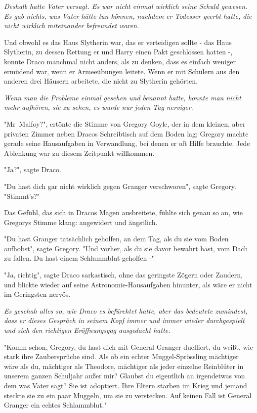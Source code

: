 {\emph{Deshalb hatte Vater versagt. Es war nicht einmal wirklich seine Schuld gewesen. Es gab nichts, was Vater hätte tun können, nachdem er Todesser geerbt hatte, die nicht wirklich miteinander befreundet waren.}

Und obwohl es das Haus Slytherin war, das er verteidigen sollte - das Haus Slytherin, zu dessen Rettung er und Harry einen Pakt geschlossen hatten -, konnte Draco manchmal nicht anders, als zu denken, dass es einfach weniger ermüdend war, wenn er Armeeübungen leitete. Wenn er mit Schülern aus den anderen drei Häusern arbeitete, die nicht zu Slytherin gehörten.

\emph{Wenn man die Probleme einmal gesehen und benannt hatte, konnte man nicht mehr aufhören, sie zu sehen, es wurde nur jeden Tag nerviger}.

"Mr~Malfoy?", ertönte die Stimme von Gregory Goyle, der in dem kleinen, aber privaten Zimmer neben Dracos Schreibtisch auf dem Boden lag; Gregory machte gerade seine Hausaufgaben in Verwandlung, bei denen er oft Hilfe brauchte. Jede Ablenkung war zu diesem Zeitpunkt willkommen.

"Ja?", sagte Draco.

"Du hast dich gar nicht wirklich gegen Granger verschworen", sagte Gregory. "Stimmt's?"

Das Gefühl, das sich in Dracos Magen ausbreitete, fühlte sich genau so an, wie Gregorys Stimme klang: angewidert und ängstlich.

"Du hast Granger tatsächlich geholfen, an dem Tag, als du sie vom Boden aufhobst", sagte Gregory. "Und vorher, als du sie davor bewahrt hast, vom Dach zu fallen. Du hast einem Schlammblut geholfen -"

"Ja, richtig", sagte Draco sarkastisch, ohne das geringste Zögern oder Zaudern, und blickte wieder auf seine Astronomie-Hausaufgaben hinunter, als wäre er nicht im Geringsten nervös.

\emph{Es geschah alles so, wie Draco es befürchtet hatte, aber das bedeutete zumindest, dass er dieses Gespräch in seinem Kopf immer und immer wieder durchgespielt und sich den richtigen Eröffnungsgag ausgedacht hatte.}

"Komm schon, Gregory, du hast dich mit General Granger duelliert, du weißt, wie stark ihre Zaubersprüche sind. Als ob ein echter Muggel-Sprössling mächtiger wäre als du, mächtiger als Theodore, mächtiger als jeder einzelne Reinblüter in unserem ganzen Schuljahr außer mir? Glaubst du eigentlich an irgendetwas von dem was Vater sagt? Sie ist adoptiert. Ihre Eltern starben im Krieg und jemand steckte sie zu ein paar Muggeln, um sie zu verstecken. Auf keinen Fall ist General Granger ein echtes Schlammblut."

}
